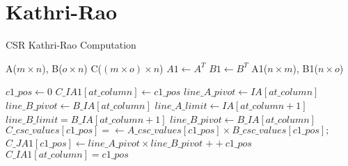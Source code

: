 \documentclass{article}
\begin{document}
\section{Kathri-Rao}
\begin{algorithm}
\caption{CSR Kathri-Rao Computation}\label{hada}
\begin{algorithmic}[1]

\Require A($m\times n$), B($o\times n$)
\Ensure C($(m\times o) \times n$)
\Statex
\State $A1 \gets A^{T}$
\State $B1 \gets B^{T}$
\Statex
\Require A1($n\times m$), B1($n\times o$)
\Statex

\State $c1\_pos \gets 0$
    \State $C\_IA1[at\_column] \gets c1\_pos$
    \State $line\_A\_pivot \gets IA[at\_column]$
    \State $line\_B\_pivot \gets B\_IA[at\_column]$
    \State $line\_A\_limit \gets IA[at\_column+1]$
    \State $line\_B\_limit = B\_IA[at\_column+1]$
    \Statex
		\State $line\_B\_pivot \gets B\_IA[at\_column]$
			\State $C\_csc\_values[c1\_pos] =\gets A\_csc\_values[c1\_pos] \times B\_csc\_values[c1\_pos];$
			\State $C\_JA1[c1\_pos] \gets line\_A\_pivot \times line\_B\_pivot$
			\State $++c1\_pos$
		\EndFor
	\EndFor
\EndFor
\Statex
\State $C\_IA1[at\_column]=c1\_pos$
\end{algorithmic}
\end{algorithm}
\end{document}

